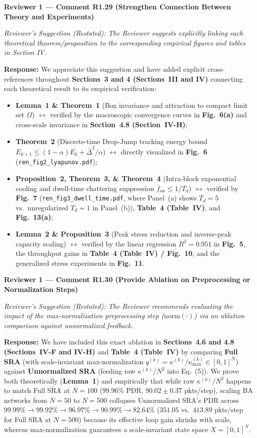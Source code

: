 \documentclass[11pt,a4paper]{article}
\newcommand{\cbox}[2]{%
  \vspace{0.6em}\noindent\textbf{#1}\par\smallskip
  \noindent\textit{Reviewer's Suggestion (Restated):} \textit{#2}\par\smallskip
}
\begin{document}
\hrulefill

\cbox{Reviewer 1 --- Comment R1.29 (Strengthen Connection Between Theory and Experiments)}{The Reviewer suggests explicitly linking each theoretical theorem/proposition to the corresponding empirical figures and tables in Section IV.}

\noindent\textbf{Response:} We appreciate this suggestion and have added explicit cross-references throughout \textbf{Sections~3 and 4 (Sections~III and IV)} connecting each theoretical result to its empirical verification:
\begin{itemize}[leftmargin=1.8em]
    \item \textbf{Lemma~1 \& Theorem~1} (Box invariance and attraction to compact limit set $\Omega$) $\leftrightarrow$ verified by the macroscopic convergence curves in \textbf{Fig.~6(a)} and cross-scale invariance in \textbf{Section~4.8 (Section~IV-H)};
    \item \textbf{Theorem~2} (Discrete-time Drop-Jump tracking energy bound $E_{k+1} \le (1-\alpha)E_k + \bar{\Delta}^2/\alpha$) $\leftrightarrow$ directly visualized in \textbf{Fig.~6} (\texttt{ren\_fig2\_lyapunov.pdf});
    \item \textbf{Proposition~2, Theorem~3, \& Theorem~4} (Intra-block exponential cooling and dwell-time chattering suppression $\bar{f}_{\text{sw}} \le 1/T_d$) $\leftrightarrow$ verified by \textbf{Fig.~7} (\texttt{ren\_fig3\_dwell\_time.pdf}, where Panel~(a) shows $T_d=5$ vs.\ unregularized $T_d=1$ in Panel~(b)), \textbf{Table~4 (Table~IV)}, and \textbf{Fig.~13(a)};
    \item \textbf{Lemma~2 \& Proposition~3} (Peak stress reduction and inverse-peak capacity scaling) $\leftrightarrow$ verified by the linear regression $R^2=0.951$ in \textbf{Fig.~5}, the throughput gains in \textbf{Table~4 (Table~IV) / Fig.~10}, and the generalized stress experiments in \textbf{Fig.~11}.
\end{itemize}

\hrulefill

\cbox{Reviewer 1 --- Comment R1.30 (Provide Ablation on Preprocessing or Normalization Steps)}{The Reviewer recommends evaluating the impact of the max-normalization preprocessing step ($\mathrm{norm}(\cdot)$) via an ablation comparison against unnormalized feedback.}

\noindent\textbf{Response:} We have included this exact ablation in \textbf{Sections~4.6 and 4.8 (Sections~IV-F and IV-H)} and \textbf{Table~4 (Table~IV)} by comparing \textbf{Full SRA} (with scale-invariant max-normalization $q^{(k)} = \kappa^{(k)}/\kappa_{\max}^{(k)} \in [0,1]^N$) against \textbf{Unnormalized SRA} (feeding raw $\kappa^{(k)}/N^2$ into Eq.~(5)). We prove both theoretically (\textbf{Lemma~1}) and empirically that while raw $\kappa^{(k)}/N^2$ happens to match Full SRA at $N=100$ ($99.96\%$ PDR, $90.02 \pm 0.37$ pkts/step), scaling BA networks from $N=50$ to $N=500$ collapses Unnormalized SRA's PDR across $99.99\% \to 99.92\% \to 96.97\% \to 90.99\% \to \mathbf{82.64\%}$ ($351.05$ vs.\ $413.89$ pkts/step for Full SRA at $N=500$) because its effective loop gain shrinks with scale, whereas max-normalization guarantees a scale-invariant state space $X=[0,1]^N$.
\end{document}
